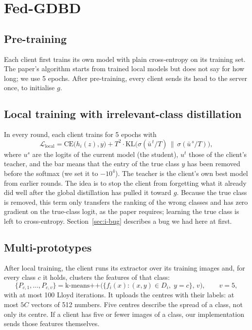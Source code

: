 \section{Fed-GDBD}
\label{sec:m-gdbd}

\subsection{Pre-training}
Each client first trains its own model with plain cross-entropy on its training set. The paper's algorithm starts from trained local models but does not say for how long; we use 5 epochs. After pre-training, every client sends its head to the server once, to initialise $g$.

\subsection{Local training with irrelevant-class distillation}
In every round, each client trains for 5 epochs with
\begin{equation}
\mathcal{L}_{\text{local}} = \mathrm{CE}\big(h_i(z), y\big) + T^2 \cdot \mathrm{KL}\big(\sigma(\bar{u}^{\,t}/T) \,\big\|\, \sigma(\bar{u}^{\,s}/T)\big),
\label{eq:local}
\end{equation}
where $u^s$ are the logits of the current model (the student), $u^t$ those of the client's teacher, and the bar means that the entry of the true class $y$ has been removed before the softmax (we set it to $-10^4$). The teacher is the client's own best model from earlier rounds. The idea is to stop the client from forgetting what it already did well after the global distillation has pulled it toward $g$. Because the true class is removed, this term only transfers the ranking of the wrong classes and has zero gradient on the true-class logit, as the paper requires; learning the true class is left to cross-entropy. Section~\ref{sec:i-bug} describes a bug we had here at first.

\subsection{Multi-prototypes}
After local training, the client runs its extractor over its training images and, for every class $c$ it holds, clusters the features of that class:
\begin{equation}
\{P_{c,1}, \dots, P_{c,v}\} = \text{k-means++}\big(\{f_i(x) : (x, y) \in D_i,\; y = c\},\, v\big), \qquad v = 5,
\label{eq:protos}
\end{equation}
with at most 100 Lloyd iterations. It uploads the centres with their labels: at most $5C$ vectors of 512 numbers. Five centres describe the spread of a class, not only its centre. If a client has five or fewer images of a class, our implementation sends those features themselves.

